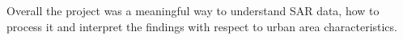 \documentclass[conference]{IEEEtran}
\begin{document}
	Overall the project was a meaningful way to understand SAR data, how to process it and interpret the findings with respect to urban area characteristics. 
	


	\nocite{*}
	\printbibliography
	
\end{document}
